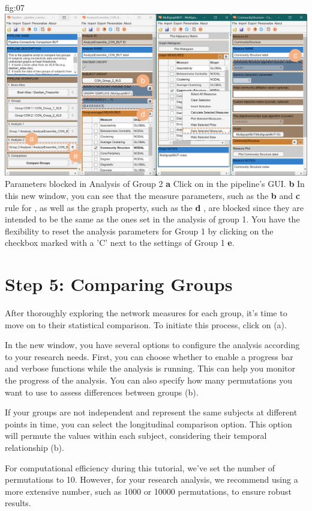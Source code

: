 \documentclass[justified]{tufte-handout}
\begin{document}
	{fig:07}
	{
	\includegraphics{fig07.jpg}
	}
	{Parameters blocked in Analysis of Group 2}
	{
	{\bf a} Click on  in the pipeline's GUI.
	{\bf b} In this new window, you can see that the measure parameters, such as the {\bf b}  and {\bf c} rule for , as well as the graph property, such as the {\bf d} , are blocked since they are intended to be the same as the ones set in the analysis of group 1. You have the flexibility to reset the analysis parameters for Group 1 by clicking on the checkbox marked with a 'C' next to the settings of Group 1 {\bf e}.
	}
 
\section{Step 5: Comparing Groups}

After thoroughly exploring the network measures for each group, it's time to move on to their statistical comparison. To initiate this process, click on  (a).

In the new window, you have several options to configure the analysis according to your research needs. First, you can choose whether to enable a progress bar and verbose functions while the analysis is running. This can help you monitor the progress of the analysis. You can also specify how many permutations you want to use to assess differences between groups (b).

If your groups are not independent and represent the same subjects at different points in time, you can select the longitudinal comparison option. This option will permute the values within each subject, considering their temporal relationship (b).

For computational efficiency during this tutorial, we've set the number of permutations to 10. However, for your research analysis, we recommend using a more extensive number, such as 1000 or 10000 permutations, to ensure robust results.
\end{document}
